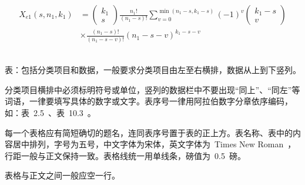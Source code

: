 \begin{equation}
  \begin{split}
    {X_{e1}}\left( {s,{n_1},{k_1}} \right) &= \left( {\begin{array}{*{20}{c}}
        {{k_1}} \\
        s
      \end{array}} \right)\frac{{{n_1}!}}{{\left( {{n_1} - s} \right)!}}\sum\nolimits_{v = 0}^{\min \left( {{n_1} - s,{k_1} - s} \right)} {{{\left( { - 1} \right)}^v}\left( {\begin{array}{*{20}{c}}
        {{k_1} - s} \\
        v
      \end{array}} \right)} \\
    & \times \frac{{\left( {{n_1} - s} \right)!}}{{\left( {{n_1} - s - v} \right)!}}{\left( {{n_1} - s - v} \right)^{{k_1} - s - v}}
  \end{split}
\end{equation}
~\par
表：包括分类项目和数据，一般要求分类项目由左至右横排，数据从上到下竖列。

分类项目横排中必须标明符号或单位，竖列的数据栏中不要出现“同上”、“同左”等词语，一律要填写具体的数字或文字。表序号一律用阿拉伯数字分章依序编码，如：表~2.5~、表~10.3~。

每一个表格应有简短确切的题名，连同表序号置于表的正上方。表名称、表中的内容居中排列，字号为五号，中文字体为宋体，英文字体为~Times New Roman~，行距一般与正文保持一致。表格线统一用单线条，磅值为~0.5~磅。

表格与正文之间一般应空一行。


